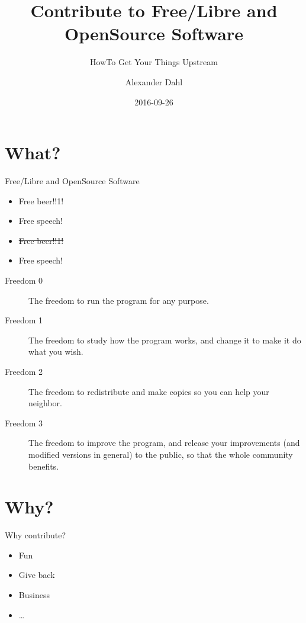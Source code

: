 \documentclass{beamer}
\title[Contrib To FLOSS]{Contribute to Free/Libre and OpenSource Software}
\subtitle{HowTo Get Your Things Upstream}
\author{Alexander Dahl}
\institute[lespocky.de]{\url{http://www.lespocky.de/}}
\date{2016-09-26}
\begin{document}
\begin{frame}
	\titlepage
\end{frame}


\section{What?}

\begin{frame}{Free/Libre and OpenSource Software}
    {
        \begin{itemize}
            \item Free beer!!1!
            \item<2-> Free speech!
        \end{itemize}
    }

    {
        \begin{itemize}
            \item \sout{Free beer!!1!}
            \item Free speech!
        \end{itemize}
    }

    {
        \begin{description}
            \item[Freedom 0] The freedom to run the program for any purpose.
            \item[Freedom 1] The freedom to study how the program works, and
                change it to make it do what you wish.
            \item[Freedom 2] The freedom to redistribute and make copies so
                you can help your neighbor.
            \item[Freedom 3] The freedom to improve the program, and release
                your improvements (and modified versions in general) to the
                public, so that the whole community benefits.
        \end{description}
    }
\end{frame}

\section{Why?}

\begin{frame}{Why contribute?}
    \begin{itemize}
        \item Fun
        \item Give back
        \item Business
        \item \dots
    \end{itemize}
\end{frame}
\end{document}
